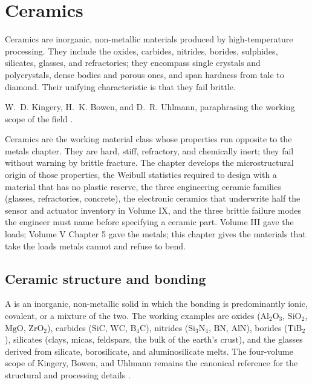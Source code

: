\chapter{Ceramics}
\label{vol05:ch07}

\epigraph{Ceramics are inorganic, non-metallic materials produced by
high-temperature processing. They include the oxides, carbides,
nitrides, borides, sulphides, silicates, glasses, and refractories; they
encompass single crystals and polycrystals, dense bodies and porous
ones, and span hardness from talc to diamond. Their unifying
characteristic is that they fail brittle.}{W.~D. Kingery, H.~K. Bowen,
and D.~R. Uhlmann, paraphrasing the working scope of the field
\cite[ch.~1, pp.~3--5]{text:kingery-ceramics}.}


\noindent
Ceramics are the working material class whose properties run opposite
to the metals chapter. They are hard, stiff, refractory, and chemically
inert; they fail without warning by brittle fracture. The chapter
develops the microstructural origin of those properties, the Weibull
statistics required to design with a material that has no plastic
reserve, the three engineering ceramic families (glasses, refractories,
concrete), the electronic ceramics that underwrite half the sensor and
actuator inventory in Volume IX, and the three brittle failure modes
the engineer must name before specifying a ceramic part. Volume III
gave the loads; Volume V Chapter 5 gave the metals; this chapter gives
the materials that take the loads metals cannot and refuse to bend.

\section{Ceramic structure and bonding}

A  is an inorganic, non-metallic solid in which the
bonding is predominantly ionic, covalent, or a mixture of the two. The
working examples are oxides ($\mathrm{Al_2O_3}$, $\mathrm{SiO_2}$,
$\mathrm{MgO}$, $\mathrm{ZrO_2}$), carbides ($\mathrm{SiC}$,
$\mathrm{WC}$, $\mathrm{B_4C}$), nitrides ($\mathrm{Si_3N_4}$,
$\mathrm{BN}$, $\mathrm{AlN}$), borides ($\mathrm{TiB_2}$), silicates
(clays, micas, feldspars, the bulk of the earth's crust), and the
glasses derived from silicate, borosilicate, and aluminosilicate melts.
The four-volume scope of Kingery, Bowen, and Uhlmann remains the
canonical reference for the structural and processing details
\cite[chs.~2--6]{text:kingery-ceramics}.


